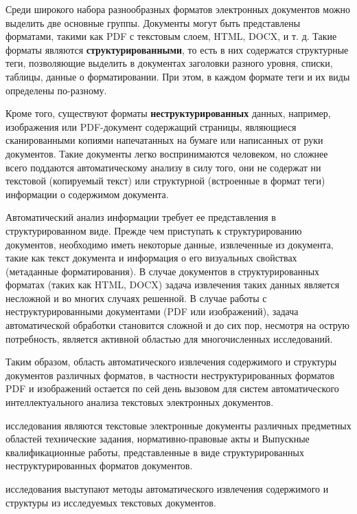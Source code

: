 Среди широкого набора разнообразных форматов электронных документов можно выделить две основные группы. Документы могут быть представлены форматами, такими как PDF с текстовым слоем, HTML, DOCX, и т. д. Такие форматы являются \textbf{структурированными}, то есть в них содержатся структурные теги, позволяющие выделить в документах заголовки разного уровня, списки, таблицы, данные о форматировании. При этом, в каждом формате теги и их виды определены по-разному.

Кроме того, существуют форматы \textbf{неструктурированных} данных, например, изображения или PDF-документ содержащий страницы, являющиеся сканированными копиями напечатанных на бумаге или написанных от руки документов. Такие документы легко воспринимаются человеком, но сложнее всего поддаются автоматическому анализу в силу того, они не содержат ни текстовой (копируемый текст) или структурной (встроенные в формат теги) информации о содержимом документа.

Автоматический анализ информации требует ее представления в структурированном виде. Прежде чем приступать к структурированию документов, необходимо иметь некоторые данные, извлеченные из документа, такие как текст документа и информация о его визуальных свойствах (метаданные форматирования). В случае документов в структурированных форматах (таких как HTML, DOCX) задача извлечения таких данных является несложной и во многих случаях решенной. В случае работы с неструктурированными документами (PDF или изображений), задача автоматической обработки становится сложной и до сих пор, несмотря на острую потребность, является активной областью для многочисленных исследований.

Таким образом, область автоматического извлечения содержимого и структуры документов различных форматов, в частности неструктурированных форматов PDF и изображений остается по сей день вызовом для систем автоматического интеллектуального анализа текстовых электронных документов.


\underline{\textbf{{\objectTXT}}} исследования являются текстовые электронные документы различных предметных областей технические задания, нормативно-правовые акты и Выпускные квалификационные работы, представленные в виде структурированных неструктурированных форматов документов.


\underline{\textbf{{\themeTXT}}} исследования выступают методы автоматического извлечения содержимого и структуры из исследуемых текстовых документов.


